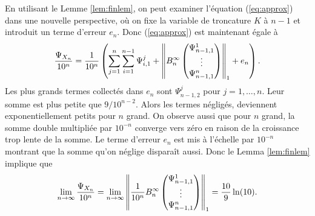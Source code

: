 En utilisant le Lemme \ref{lem:finlem}, on peut examiner l'\'equation
(\ref{eq:approx}) dans une nouvelle perspective, o\`u on fixe la variable de
troncature $K$ \`a $n-1$ et introduit un terme d'erreur $e_{n}$. Donc
(\ref{eq:approx}) est maintenant \'egale \`a
\[
	\frac{\Psi_{X_{n}}}{10^{n}} = \frac{1}{10^{n}}\left( \sum_{j=1}^{n}\sum_{i=1}^{n-1}\Psi_{i,1}^{j}
		+ \left\lVert B_{n}^{\infty} \begin{pmatrix}
			\Psi_{n-1,1}^1 \\
			\vdots \\
			\Psi_{n-1,1}^n 
	\end{pmatrix}\right\rVert_{1} + e_{n} \right).
\]
Les plus grands termes collect\'es dans $e_{n}$ sont $\Psi_{n-1,2}^{j}$ pour
$j=1,\ldots,n$. Leur somme est plus petite que $9/10^{n-2}$. Alors les termes
n\'eglig\'es, deviennent exponentiellement petits pour $n$ grand. On observe
aussi que pour $n$ grand, la somme double multipli\'ee par $10^{-n}$ converge
vers z\'ero en raison de la croissance trop lente de la somme. Le terme
d'erreur $e_{n}$ est mis \`a l'\'echelle par $10^{-n}$ montrant que la somme
qu'on n\'eglige dispara\^{i}t aussi. Donc le Lemma \ref{lem:finlem} implique
que
\[
	\lim_{n\rightarrow\infty}\frac{\Psi_{X_{n}}}{10^{n}} =
	\lim_{n\rightarrow\infty}\left\lVert\frac{1}{10^{n}}B_{n}^{\infty} 
	\begin{pmatrix}
		\Psi_{n-1,1}^1 \\
		\vdots \\
		\Psi_{n-1,1}^n 
	\end{pmatrix}\right\rVert_{1} = \frac{10}{9}\ln(10).
\]
